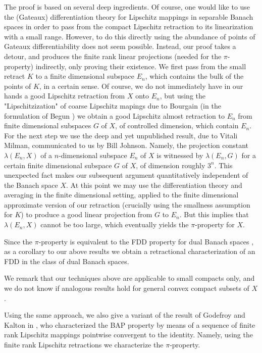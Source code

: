 \documentclass[11pt]{amsart}
\newcommand{\<}{\langle}
\renewcommand{\>}{\rangle}
\theoremstyle{definition}
\theoremstyle{remark}
\numberwithin{equation}{section}
\begin{document}
The proof is based
on several deep ingredients. Of course, one would like to use the (Gateaux) differentiation theory for Lipschitz
mappings in separable Banach spaces in order to pass from the compact Lipschitz retraction to
its linearization with a small range. However,  to do this directly using the 
abundance of points of Gateaux differentiability  does not seem possible. Instead, our proof takes a detour, and produces the finite rank
linear projections (needed for the $\pi$-property) indirectly, only proving their existence. 
We first pass from the small retract $K$ to a finite dimensional subspace $E_n$, which contains the bulk of the points of $K$, in a certain sense. Of course, we do not immediately have in our hands
a good Lipschitz retraction from $X$ onto $E_n$, but using the "Lipschitzization" of coarse Lipschitz mapings due to Bourgain \cite{Bou87} (in the formulation of Begun \cite{B99}) we obtain a good Lipschitz almost retraction to $E_n$ from  finite dimensional
subspaces $G$ of $X$, of controlled dimension, which contain $E_n$. For the next step we use the deep and yet unpublished result,
 due to Vitali Milman,
communicated to us by Bill Johnson. Namely, the projection constant $\lambda(E_n,X)$
of a $n$-dimensional subspace $E_n$ of $X$ is witnessed by $\lambda(E_n, G)$ for a certain finite dimensional subspace $G$ of $X$,
of dimension roughly $3^n$. This unexpected fact makes our subsequent argument  quantitatively independent of the
Banach space $X$.  At this point we may use the differentiation theory and averaging in the finite dimensional setting, applied to
the finite dimensional approximate version of our retraction (crucially using the smallness assumption for $K$)
to produce a good linear projection from $G$ to $E_n$. But this implies that $\lambda(E_n,X)$ cannot be too large, which eventually yields the $\pi$-property for $X$.

Since the $\pi$-property is equivalent to the FDD property for dual Banach spaces \cite{JRZ71}, as a corollary to our
above results we obtain a retractional characterization of  an FDD in the class of dual Banach spaces.

We remark that our techniques above are applicable to small compacts only, and we do not know
if analogous results hold for general convex compact subsets of $X$. 

Using the same approach,
we also give a variant of the result of Godefroy and Kalton in \cite{GK03}, who characterized the BAP
property by means of a sequence of finite rank Lipschitz mappings pointwise convergent to the identity. Namely, using the finite rank Lipschitz retractions we characterize the $\pi$-property.
\end{document}
